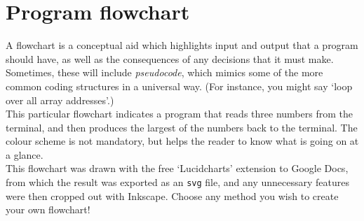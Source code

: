 \chapter{Program flowchart}\label{app:flowchart}

A flowchart is a conceptual aid which highlights input and output that a program should have, as well as the consequences of any decisions that it must make. Sometimes, these will include \textit{pseudocode}, which mimics some of the more common coding structures in a universal way. (For instance, you might say `loop over all array addresses'.)\\

This particular flowchart indicates a program that reads three numbers from the terminal, and then produces the largest of the numbers back to the terminal. The colour scheme is not mandatory, but helps the reader to know what is going on at a glance.\\

This flowchart was drawn with the free `Lucidcharts' extension to Google Docs, from which the result was exported as an \texttt{svg} file, and any unnecessary features were then cropped out with Inkscape. Choose any method you wish to create your own flowchart!